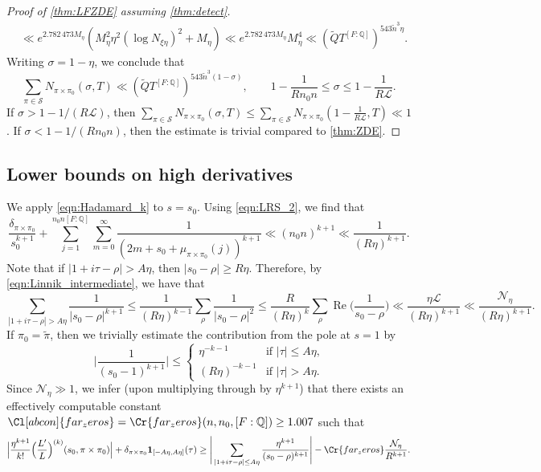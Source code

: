\documentclass[11pt]{amsart}
\theoremstyle{remark}
\numberwithin{equation}{section}
\newcommand{\Q}{\mathbb{Q}}
\renewcommand{\tilde}{\widetilde}
\newcommand{\re}{\mathop{\mathrm{Re}}}
\begin{document}
\begin{proof}[Proof of \cref{thm:LFZDE} assuming \cref{thm:detect}]
\begin{align*}
&\ll e^{2.782\,473 M_{\eta}}(M_{\eta}^2 \eta^2(\log N_{\xi\eta})^2+M_{\eta})\ll e^{2.782\,473 M_{\eta}}M_{\eta}^4\ll (\tilde{Q}T^{[F:\Q]})^{543\tilde{n}^3 \eta}.
\end{align*}
Writing $\sigma=1-\eta$, we conclude that
\[
\sum_{\pi\in\mathcal{S}}N_{\pi\times\pi_0}(\sigma,T)\ll (\tilde{Q}T^{[F:\Q]})^{543\tilde{n}^3(1-\sigma)},\qquad 1-\frac{1}{Rn_0 n}\leq\sigma\leq 1-\frac{1}{R\mathcal{L}}.
\]
If $\sigma>1-1/(R\mathcal{L})$, then $\sum_{\pi\in\mathcal{S}}N_{\pi\times\pi_0}(\sigma,T)\leq \sum_{\pi\in\mathcal{S}}N_{\pi\times\pi_0}(1-\tfrac{1}{R\mathcal{L}},T)\ll 1$.  If $\sigma<1-1/(Rn_0 n)$, then the estimate is trivial compared to \cref{thm:ZDE}.
\end{proof}

\subsection{Lower bounds on high derivatives}

We apply  \eqref{eqn:Hadamard_k} to $s = s_0$.  Using \eqref{eqn:LRS_2}, we find that
\[
\frac{\delta_{\pi\times\pi_0}}{s_0^{k+1}}+\sum_{j=1}^{n_0 n [F:\Q]}\sum_{m=0}^{\infty}\frac{1}{(2m+s_0+\mu_{\pi\times\pi_0}(j))^{k+1}}\ll (n_0 n)^{k+1}\ll \frac{1}{(R\eta)^{k+1}}.
\]
Note that if $|1+i\tau-\rho|>A\eta$, then $|s_0-\rho|\geq R\eta$.  Therefore, by \eqref{eqn:Linnik_intermediate}, we have that
\[
\sum_{|1+i\tau-\rho|>A\eta}\frac{1}{|s_0-\rho|^{k+1}}\leq \frac{1}{(R\eta)^{k-1}}\sum_{\rho}\frac{1}{|s_0-\rho|^2}\leq\frac{R}{(R\eta)^{k}}\sum_{\rho}\re\Big(\frac{1}{s_0-\rho}\Big)\ll\frac{\eta\mathcal{L}}{(R\eta)^{k+1}}\ll \frac{\mathcal{N}_{\eta}}{(R\eta)^{k+1}}.
\]
If $\pi_0=\tilde{\pi}$, then we trivially estimate the contribution from the pole at $s=1$ by
\[
\Big|\frac{1}{(s_0-1)^{k+1}}\Big|\leq \begin{cases}
	\eta^{-k-1}&\mbox{if $|\tau|\leq A\eta$,}\\
	(R\eta)^{-k-1}&\mbox{if $|\tau|>A\eta$.}
\end{cases}
\]
Since $\mathcal{N}_{\eta}\gg 1$, we infer (upon multiplying through by $\eta^{k+1}$) that there exists an effectively computable constant $\Cl[abcon]{far_zeros}=\Cr{far_zeros}(n,n_0,[F:\Q])\geq 1.007$ such that
\begin{equation}
\label{eqn:lower_1}
\Big|\frac{\eta^{k+1}}{k!}\Big(\frac{L'}{L}\Big)^{(k)}(s_0,\pi\times\pi_0)\Big|+\delta_{\pi\times\pi_0}\mathbf{1}_{[-A\eta,A\eta]}(\tau)\geq \Bigg|\sum_{|1+i\tau-\rho|\leq A\eta}\frac{\eta^{k+1}}{(s_0-\rho)^{k+1}}\Bigg|-\Cr{far_zeros}\frac{\mathcal{N}_{\eta}}{R^{k+1}}.
\end{equation}
\end{document}
